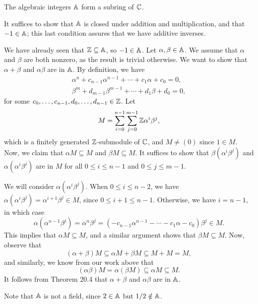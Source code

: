\begin{theo}{}
    The algebraic integers $\mathbb{A}$ form a subring of $\mathbb{C}$. 
\end{theo}
\begin{pf}
    It suffices to show that $\mathbb{A}$ is closed under addition and multiplication, 
    and that $-1 \in \mathbb{A}$; this last condition assures that we have additive inverses. 

    We have already seen that $\mathbb{Z} \subseteq \mathbb{A}$, so $-1 \in \mathbb{A}$. Let 
    $\alpha, \beta \in \mathbb{A}$. We assume that $\alpha$ and $\beta$ are both 
    nonzero, as the result is trivial otherwise. We want to show that 
    $\alpha + \beta$ and $\alpha\beta$ are in $\mathbb{A}$. By definition, we have 
    \begin{align*}
        \alpha^n + c_{n-1} \alpha^{n-1} + \cdots + c_1 \alpha + c_0 = 0, \\ 
        \beta^m + d_{m-1} \beta^{m-1} + \cdots + d_1 \beta + d_0 = 0,
    \end{align*}
    for some $c_0, \dots, c_{n-1}, d_0, \dots, d_{n-1} \in \mathbb{Z}$. Let 
    \[ M = \sum_{i=0}^{n-1} \sum_{j=0}^{m-1} \mathbb{Z}\alpha^i\beta^j, \] 
    which is a finitely generated $\mathbb{Z}$-submodule of $\mathbb{C}$, and $M \neq (0)$ since 
    $1 \in M$. Now, we claim that $\alpha M \subseteq M$ and $\beta M \subseteq M$. 
    It suffices to show that $\beta (\alpha^i \beta^j)$ and $\alpha (\alpha^i 
    \beta^j)$ are in $M$ for all $0 \leq i \leq n-1$ and $0 \leq j \leq m-1$. 

    We will consider $\alpha(\alpha^i \beta^j)$. When $0 \leq i \leq n-2$, we have 
    $\alpha (\alpha^i \beta^j) = \alpha^{i+1} \beta^j \in M$, since 
    $0 \leq i+1 \leq n-1$. Otherwise, we have $i = n-1$, in which case 
    \[ \alpha(\alpha^{n-1}\beta^j) = \alpha^n \beta^j = 
    (-c_{n-1} \alpha^{n-1} - \cdots - c_1 \alpha- c_0) \beta^j
    \in M. \] 
    This implies that $\alpha M \subseteq M$, and a similar argument shows that 
    $\beta M \subseteq M$. Now, observe that 
    \[ (\alpha + \beta)M \subseteq \alpha M + \beta M \subseteq M + M = M, \] 
    and similarly, we know from our work above that 
    \[ (\alpha \beta) M = \alpha(\beta M) \subseteq \alpha M \subseteq M. \] 
    It follows from Theorem 20.4 that $\alpha + \beta$ and $\alpha\beta$ are in $\mathbb{A}$.
\end{pf}

\begin{remark}{}
    Note that $\mathbb{A}$ is not a field, since $2 \in \mathbb{A}$ but $1/2 \notin \mathbb{A}$. 
\end{remark}

